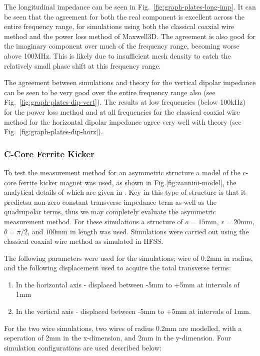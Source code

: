 \documentclass[review, number, sort&compress]{elsarticle}
\begin{document}
The longitudinal impedance can be seen in Fig.~\ref{fig:graph-plates-long-imp}. It can be seen that the agreement for both the real component is excellent across the entire frequency range, for simulations using both the classical coaxial wire method and the power loss method of Maxwell3D. The agreement is also good for the imaginary component over much of the frequency range, becoming worse above 100MHz. This is likely due to insufficient mesh density to catch the relatively small phase shift at this frequency range.

The agreement between simulations and theory for the vertical dipolar impedance can be seen to be very good over the entire frequency range also (see Fig.~\ref{fig:graph-plates-dip-vert}). The results at low frequencies (below 100kHz) for the power loss method and at all frequencies for the classical coaxial wire method for the horizontal dipolar impedance agree very well with theory (see Fig.~\ref{fig:graph-plates-dip-horz}). 

\subsubsection{C-Core Ferrite Kicker}

To test the measurement method for an asymmetric structure a model of the c-core ferrite kicker magnet was used, as shown in Fig.\ref{fig:zannini-model}, the analytical details of which are given in \cite{Zannini:cCoreFerrite}. Key in this type of structure is that it predictsa non-zero constant transverse impedance term as well as the quadrupolar terms, thus we may completely evaluate the asymmetric measurement method. For these simulations a structure of $a=15$mm, $r=20$mm, $\theta = \pi / 2$, and $100$mm in length was used. Simulations were carried out using the classical coaxial wire method as simulated in HFSS.

The following parameters were used for the simulations; wire of 0.2mm in radius, and the following displacement used to acquire the total transverse terms:

\begin{enumerate}
\item{In the horizontal axis -  displaced between -5mm to +5mm at intervals of 1mm}
\item{In the vertical axis - displaced between -5mm to +5mm at intervals of 1mm.}
\end{enumerate}

For the two wire simulations, two wires of radius 0.2mm are modelled, with a seperation of 2mm in the x-dimension, and 2mm in the y-dimension. Four simulation configurations are used described below:
\end{document}

